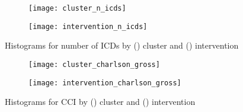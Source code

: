 \begin{figure}
    \centering
    \begin{subfigure}{\halfimgwidth}
        \texttt{[image: cluster\_n\_icds]}
        \caption{}\label{fig:cluster_n_icds}
    \end{subfigure}\hfill%
    \begin{subfigure}{\halfimgwidth}
        \texttt{[image: intervention\_n\_icds]}
        \caption{}\label{fig:intervention_n_icds}
    \end{subfigure}
    \caption{%
        Histograms for number of ICDs by () cluster
        and () intervention
    }\label{fig:n_icds_hist}
\end{figure}

\begin{figure}
    \centering
    \begin{subfigure}{\halfimgwidth}
        \texttt{[image: cluster\_charlson\_gross]}
        \caption{}\label{fig:cluster_charlson}
    \end{subfigure}\hfill%
    \begin{subfigure}{\halfimgwidth}
        \texttt{[image: intervention\_charlson\_gross]}
        \caption{}\label{fig:intervention_charlson}
    \end{subfigure}
    \caption{%
        Histograms for CCI by () cluster and
        () intervention
    }\label{fig:charlson_hist}
\end{figure}


